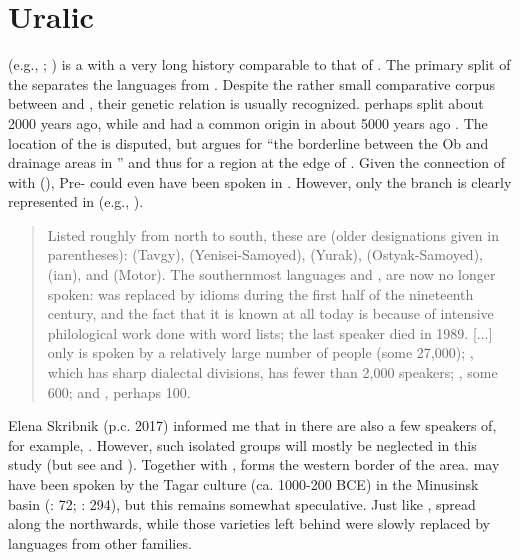 \section{Uralic}\label{sec:2.12}

 (e.g., \citealt{Sinor1988}; \citealt{Abondolo1998}) is a  with a very long history comparable to that of . The primary split of the  separates the  languages from . Despite the rather small comparative corpus between  and , their genetic relation is usually recognized.  perhaps split about 2000 years ago, while  and  had a common origin in  about 5000 years ago \citep[68]{Janhunen2009}. The location of the   is disputed, but \citet[71]{Janhunen2009} argues for “the borderline between the Ob and  drainage areas in ” and thus for a region at the edge of . Given the connection of  with  (), Pre- could even have been spoken in . However, only the  branch is clearly represented in  (e.g., \citealt{Janhunen1998}).

\begin{quote}
Listed roughly from north to south, these are (older designations given in parentheses):  (Tavgy),  (Yenisei-Samoyed),  (Yurak),  (Ostyak-Samoyed), (ian), and  (Motor). The southernmost languages  and , are now no longer spoken:  was replaced by  idioms during the first half of the nineteenth century, and the fact that it is known at all today is because of intensive philological work done with word lists; the last  speaker died in 1989. [...] only  is spoken by a relatively large number of people (some 27,000); , which has sharp dialectal divisions, has fewer than 2,000 speakers; , some 600; and , perhaps 100. \citep[2]{Abondolo1998}
\end{quote}

Elena Skribnik (p.c. 2017) informed me that in  there are also a few speakers of, for example, . However, such isolated groups will mostly be neglected in this study (but see \citealt{Miestamo2011} and ). Together with ,  forms the western border of the  area.  may have been spoken by the Tagar culture (ca. 1000-200 BCE) in the Minusinsk basin (\citealt{Janhunen2009}: 72; \citealt{Parpola2012}: 294), but this remains somewhat speculative. Just like ,  spread along the  northwards, while those varieties left behind were slowly replaced by languages from other families.

